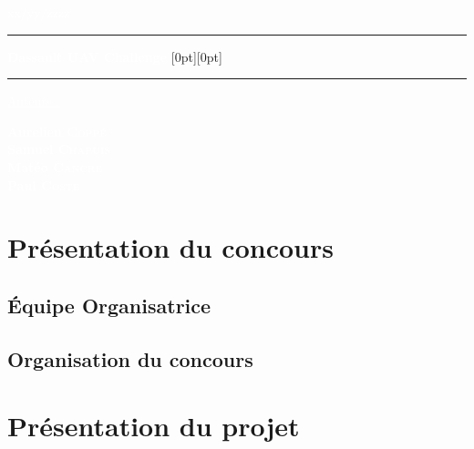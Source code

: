 \documentclass{report}
\begin{document}
	\begin{titlepage}
		\BgThispage
		\begin{center}
			\vspace*{2cm}
			\textcolor{white}{
					\large
					xx/yy/zzzz
				}
			\fontsize{50}{60} %
			\sffamily %
			
			\textcolor{white}{\rule{\textwidth}{1pt}}
			\textbf{\textcolor{white}{Dassault UAV Challenge}}
			\raisebox{1.3cm}[0pt][0pt]{\textcolor{white}{\rule{\textwidth}{1pt}}}

			\normalsize
			\rmfamily %
			\textcolor{white}{
					\Huge
					\underline{Auteurs :} \\
				}

			\vspace*{0.3cm}
			\textcolor{white}{
				\Large
				\textbf{Aurelien \textsc{Coppé}} \\
				\textbf{Samuel \textsc{Chapuis}} \\
				\textbf{Matéo \textsc{Cancre}} \\
				\textbf{Paul \textsc{Coste}} \\
			}

		\end{center}
	\end{titlepage}

	\chapter{Présentation du concours}
		\section{Équipe Organisatrice}
		

		\section{Organisation du concours}
		
	\chapter{Présentation du projet}
		
\end{document}
